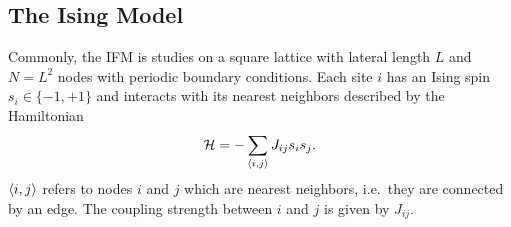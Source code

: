 \subsection{The Ising Model}
\label{ssec:model}
    Commonly, the IFM is studies on a square lattice with lateral length
    \(L\) and \(N=L^2\) nodes with periodic boundary conditions.
    Each site $i$ has an Ising spin \(s_i \in \{-1,+1\}\) and interacts with its
    nearest neighbors described by the Hamiltonian
    \begin{equation}
        \mathcal{H} = - \sum_{\left< i,j \right>}J_{ij}s_{i}s_{j}.
        \label{eq:hamiltonian}
    \end{equation}
    \(\left< i,j \right>\) refers to nodes \(i\) and \(j\) which are
    nearest neighbors, i.e.~they are connected by an edge.
    The coupling strength between \(i\) and \(j\) is given by
    \(J_{ij}\).

